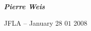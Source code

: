\documentclass[landscape]{slides}
\begin{document}

\vspace*{2cm}

\begin{center}

{\large \bf \em Pierre Weis}

\vspace*{3cm}

JFLA -- January 28 $01$ 2008

\end{center}




\end{document}
